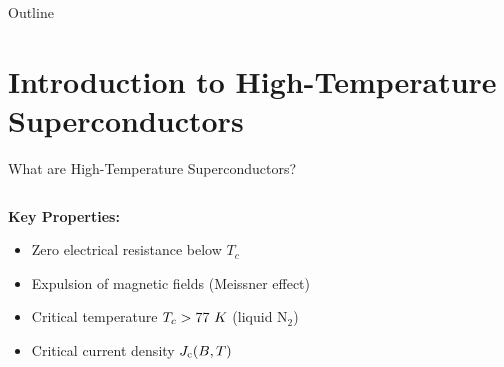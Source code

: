 \begin{frame}{Outline}
    \tableofcontents
\end{frame}

\section{Introduction to High-Temperature Superconductors}

\begin{frame}{What are High-Temperature Superconductors?}
    \begin{columns}
        \begin{column}{0.6\textwidth}
            \textbf{Key Properties:}
            \begin{itemize}
                \item Zero electrical resistance below $T_c$
                \item Expulsion of magnetic fields (Meissner effect)
                \item Critical temperature $T_c > 77~K$ (liquid N$_2$)
                \item Critical current density $J_\text{c}(B,T)$
            \end{itemize}
            

\end{column}
\end{columns}
\end{frame}

